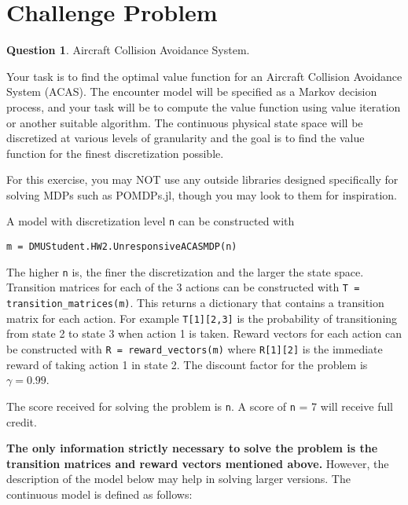 \documentclass{article}
\theoremstyle{definition}
\newtheorem{question}[thm]{Question}
\begin{document}
\section{Challenge Problem}

\begin{question}
Aircraft Collision Avoidance System.

Your task is to find the optimal value function for an Aircraft Collision Avoidance System (ACAS). The encounter model will be specified as a Markov decision process, and your task will be to compute the value function using value iteration or another suitable algorithm. The continuous physical state space will be discretized at various levels of granularity and the goal is to find the value function for the finest discretization possible.

For this exercise, you may NOT use any outside libraries designed specifically for solving MDPs such as POMDPs.jl, though you may look to them for inspiration.

A model with discretization level \texttt{n} can be constructed with
\begin{verbatim}
m = DMUStudent.HW2.UnresponsiveACASMDP(n)
\end{verbatim}
The higher \texttt{n} is, the finer the discretization and the larger the state space. Transition matrices for each of the 3 actions can be constructed with \texttt{T = transition\_matrices(m)}. This returns a dictionary that contains a transition matrix for each action. For example \texttt{T[1][2,3]} is the probability of transitioning from state 2 to state 3 when action 1 is taken. Reward vectors for each action can be constructed with \texttt{R = reward\_vectors(m)} where \texttt{R[1][2]} is the immediate reward of taking action 1 in state 2.
The discount factor for the problem is $\gamma = 0.99$.

The score received for solving the problem is \texttt{n}. A score of \texttt{n} = 7 will receive full credit.

\vspace{1em}
\noindent\makebox[\linewidth]{\rule{\textwidth}{0.4pt}}
\vspace{1em}

\textbf{The only information strictly necessary to solve the problem is the transition matrices and reward vectors mentioned above.} However, the description of the model below may help in solving larger versions. The continuous model is defined as follows:


\end{question}
\end{document}
